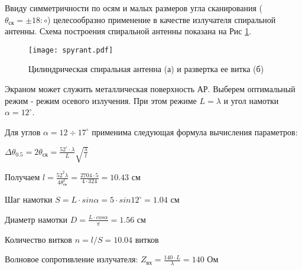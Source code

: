 Ввиду симметричности по осям и малых размеров угла сканирования ($\theta_\text{ск}=\pm18:\circ$) целесообразно применение в качестве излучателя спиральной антенны. Схема построения спиральной антенны показана на Рис \ref{fig:spyrant}. 

\begin{figure}[H]
	\centering
	\texttt{[image: spyrant.pdf]}
	\caption{Цилиндрическая спиральная антенна (а) и развертка ее витка (б)}
	\label{fig:spyrant}
\end{figure}

Экраном может служить металлическая поверхность АР. Выберем оптимальный режим - режим осевого излучения. При этом режиме $L=\lambda$ и угол намотки $\alpha=12^\circ$.

Для углов $\alpha=12\div17^\circ$ применима следующая формула вычисления параметров:

$\displaystyle \Delta\theta_{0.5}=2\theta_\text{ск}=\frac{52^\circ\cdot\lambda}{L}\sqrt{\frac{\lambda}{l}}$

Получаем $\displaystyle l=\frac{52^2\lambda}{4\theta^2_\text{ск}}=\frac{2704\cdot5}{4\cdot324}=10.43 \text{ см}$

Шаг намотки $\displaystyle S=L\cdot sin\alpha=5\cdot sin12^\circ=1.04 \text{ см}$

Диаметр намотки $\displaystyle D=\frac{L\cdot cos\alpha}{\pi}=1.56 \text{ см}$

Количество витков $\displaystyle n=l/S=10.04 \text{ витков}$

Волновое сопротивление излучателя: $\displaystyle Z_\text{вх}=\frac{140\cdot L}{\lambda}=140 \text{ Ом}$


\hfill